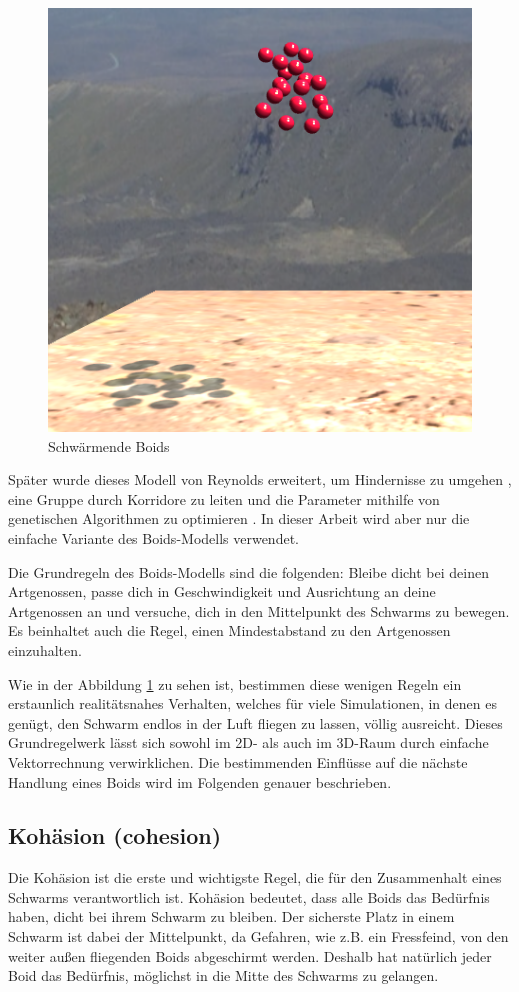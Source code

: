 \documentclass[draft=false
              ,paper=a4
              ,twoside=false
              ,fontsize=11pt
              ,headsepline
              ,BCOR10mm
              ,DIV11
              ,bibtotoc
              ,liststotoc
              ]{scrbook}
\begin{document}
\begin{figure}[!h]
\centering
\includegraphics[scale=0.50]{project/swarming.png}
\caption{Schwärmende Boids}
\label{simple}
\end{figure}

Später wurde dieses Modell von Reynolds erweitert, um Hindernisse zu umgehen \cite{alife92*327}, eine Gruppe durch Korridore zu leiten \cite{reynolds:1994:ecfbnw} und die Parameter mithilfe von genetischen Algorithmen zu optimieren \cite{sab92:reynolds}. In dieser Arbeit wird aber nur die einfache Variante des Boids-Modells verwendet.

Die Grundregeln des Boids-Modells sind die folgenden: Bleibe dicht bei deinen Artgenossen, passe dich in Geschwindigkeit und Ausrichtung an deine Artgenossen an und versuche, dich in den Mittelpunkt des Schwarms zu bewegen.
Es beinhaltet auch die Regel, einen Mindestabstand zu den Artgenossen einzuhalten.

Wie in der Abbildung \ref{simple} zu sehen ist, bestimmen diese wenigen Regeln ein erstaunlich realitätsnahes Verhalten, welches für viele Simulationen, in denen es genügt, den Schwarm endlos in der Luft fliegen zu lassen, völlig ausreicht. Dieses Grundregelwerk lässt sich sowohl im 2D- als auch im 3D-Raum durch einfache Vektorrechnung verwirklichen. Die bestimmenden Einflüsse auf die nächste Handlung eines Boids wird im Folgenden genauer beschrieben.
\subsection{Kohäsion (cohesion)}
Die Kohäsion ist die erste und wichtigste Regel, die für den Zusammenhalt eines Schwarms verantwortlich ist. Kohäsion bedeutet, dass alle Boids das Bedürfnis haben, dicht bei ihrem Schwarm zu bleiben. Der sicherste Platz in einem Schwarm ist dabei der Mittelpunkt, da Gefahren, wie z.B. ein Fressfeind, von den weiter außen fliegenden Boids abgeschirmt werden. Deshalb hat natürlich jeder Boid das Bedürfnis, möglichst in die Mitte des Schwarms zu gelangen.
\end{document}
